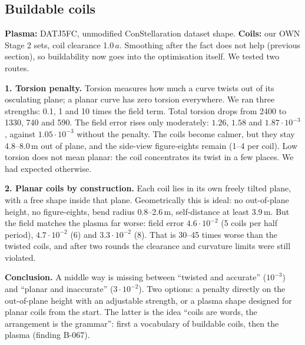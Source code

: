 \subsection{Buildable coils}\label{sec:baubare-spulen}
\textbf{Plasma:} DATJ5FC, unmodified ConStellaration dataset shape. \textbf{Coils:} our OWN Stage 2 sets, coil clearance 1.0\,$a$. Smoothing after the fact does not help (previous section), so buildability now goes into the optimisation itself. We tested two routes.

\textbf{1. Torsion penalty.} Torsion measures how much a curve twists out of its osculating plane; a planar curve has zero torsion everywhere. We ran three strengths: 0.1, 1 and 10 times the field term. Total torsion drops from 2400 to 1330, 740 and 590. The field error rises only moderately: $1.26$, $1.58$ and $1.87\cdot10^{-3}$, against $1.05\cdot10^{-3}$ without the penalty. The coils become calmer, but they stay 4.8--8.0\,m out of plane, and the side-view figure-eights remain (1--4 per coil). Low torsion does not mean planar: the coil concentrates its twist in a few places. We had expected otherwise.

\textbf{2. Planar coils by construction.} Each coil lies in its own freely tilted plane, with a free shape inside that plane. Geometrically this is ideal: no out-of-plane height, no figure-eights, bend radius 0.8--2.6\,m, self-distance at least 3.9\,m. But the field matches the plasma far worse: field error $4.6\cdot10^{-2}$ (5 coils per half period), $4.7\cdot10^{-2}$ (6) and $3.3\cdot10^{-2}$ (8). That is 30--45 times worse than the twisted coils, and after two rounds the clearance and curvature limits were still violated.

\textbf{Conclusion.} A middle way is missing between ``twisted and accurate'' ($10^{-3}$) and ``planar and inaccurate'' ($3\cdot10^{-2}$). Two options: a penalty directly on the out-of-plane height with an adjustable strength, or a plasma shape designed for planar coils from the start. The latter is the idea ``coils are words, the arrangement is the grammar'': first a vocabulary of buildable coils, then the plasma (finding B-067).

